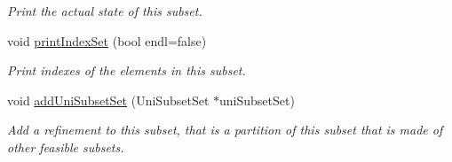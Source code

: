\begin{DoxyCompactItemize}
\begin{DoxyCompactList}\small\item\em Print the actual state of this subset. \end{DoxyCompactList}\item 
\hypertarget{classUniSubset_aea0db49838de9813249152cd3128a47e}{void \hyperlink{classUniSubset_aea0db49838de9813249152cd3128a47e}{print\-Index\-Set} (bool endl=false)}\label{classUniSubset_aea0db49838de9813249152cd3128a47e}

\begin{DoxyCompactList}\small\item\em Print indexes of the elements in this subset. \end{DoxyCompactList}\item 
\hypertarget{classUniSubset_a7000de6419fa5cdd69b577dbdb6f4b59}{void \hyperlink{classUniSubset_a7000de6419fa5cdd69b577dbdb6f4b59}{add\-Uni\-Subset\-Set} (Uni\-Subset\-Set $\ast$uni\-Subset\-Set)}\label{classUniSubset_a7000de6419fa5cdd69b577dbdb6f4b59}

\begin{DoxyCompactList}\small\item\em Add a refinement to this subset, that is a partition of this subset that is made of other feasible subsets. \end{DoxyCompactList}\end{DoxyCompactItemize}
